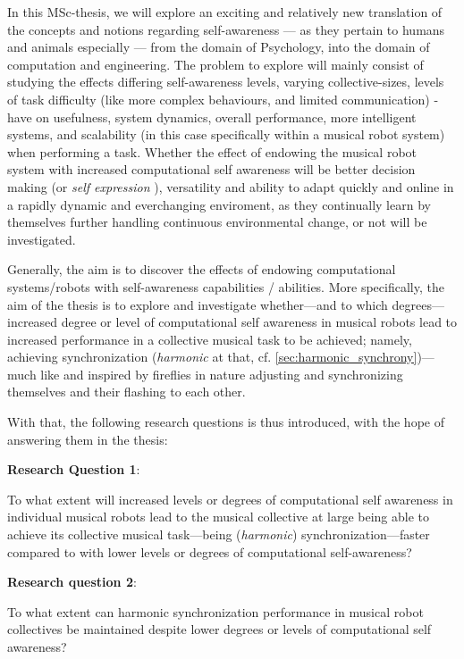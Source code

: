 In this MSc-thesis, we will explore an exciting and relatively new translation of the concepts and notions regarding self-awareness — as they pertain to humans and animals especially — from the domain of Psychology, into the domain of computation and engineering. The problem to explore will mainly consist of studying the effects differing self-awareness levels, varying collective-sizes, levels of task difficulty (like more complex behaviours, and limited communication) - have on usefulness, system dynamics, overall performance, more intelligent systems, and scalability (in this case specifically within a musical robot system) when performing a task. Whether the effect of endowing the musical robot system with increased computational self awareness will be better decision making (or \textit{self expression} \cite{sacs16_ch2}), versatility and ability to adapt quickly and online in a rapidly dynamic and everchanging enviroment, as they continually learn by themselves further handling continuous environmental change, or not will be investigated.

Generally, the aim is to discover the effects of endowing computational systems/robots with self-awareness capabilities / abilities. More specifically, the aim of the thesis is to explore and investigate whether—and to which degrees—increased degree or level of computational self awareness in musical robots lead to increased performance in a collective musical task to be achieved; namely, achieving synchronization (\textit{harmonic} at that, cf. \ref{sec:harmonic_synchrony})—much like and inspired by fireflies in nature adjusting and synchronizing themselves and their flashing to each other.

With that, the following research questions is thus introduced, with the hope of answering them in the thesis: \nl

\textbf{Research Question 1}:

To what extent will increased levels or degrees of computational self awareness in individual musical robots lead to the musical collective at large being able to achieve its collective musical task—being (\textit{harmonic}) synchronization—faster compared to with lower levels or degrees of computational self-awareness? \nl

\textbf{Research question 2}:

To what extent can harmonic synchronization performance in musical robot collectives be maintained despite lower degrees or levels of computational self awareness? \nl

